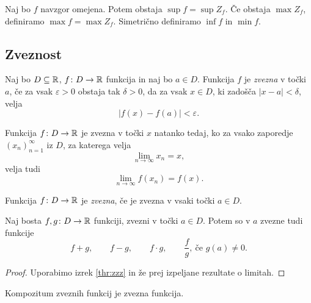 \documentclass[12pt, a4paper]{article}
\begin{document}
\begin{definicija}
Naj bo $f$ navzgor omejena. Potem obstaja $\sup f =\sup Z_f$. Če obstaja $\max Z_f$, definiramo $\max f=\max Z_f$. Simetrično definiramo $\inf f$ in $\min f$.
\end{definicija}

\newpage

\subsection{Zveznost}

\begin{okvir}
\begin{definicija}
Naj bo $D\subseteq\mathbb{R}$, $f\colon D\to\mathbb{R}$ funkcija in naj bo $a\in D$. Funkcija $f$ je \emph{zvezna} v točki $a$, če za vsak $\varepsilon>0$ obstaja tak $\delta>0$, da za vsak $x\in D$, ki zadošča $|x-a|<\delta$, velja
\[
|f(x)-f(a)|<\varepsilon.
\]
\end{definicija}
\end{okvir}

\begin{izrek}\label{thr:zzz}
Funkcija $f\colon D\to\mathbb{R}$ je zvezna v točki $x$ natanko tedaj, ko za vsako zaporedje $(x_n)_{n=1}^\infty$ iz $D$, za katerega velja
\[
\lim_{n\to\infty}x_n=x,
\]
velja tudi
\[
\lim_{n\to\infty}f(x_n)=f(x).
\]
\end{izrek}

\obvs

\begin{definicija}
Funkcija $f\colon D\to\mathbb{R}$ je \emph{zvezna}, če je zvezna v vsaki točki $a\in D$.
\end{definicija}

\begin{izrek}
Naj bosta $f,g\colon D\to\mathbb{R}$ funkciji, zvezni v točki $a\in D$. Potem so v $a$ zvezne tudi funkcije
\[
f+g,\qquad f-g,\qquad f\cdot g,\qquad \frac{f}{g},~\text{če $g(a)\ne 0$}.
\]
\end{izrek}

\begin{proof}
Uporabimo izrek \ref{thr:zzz} in že prej izpeljane rezultate o limitah.
\end{proof}

\begin{izrek}
Kompozitum zveznih funkcij je zvezna funkcija.
\end{izrek}

\obvs
\end{document}
